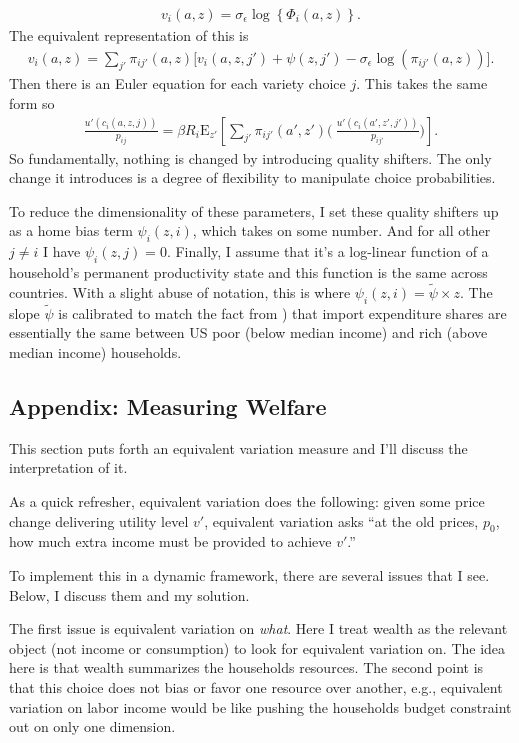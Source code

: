 \documentclass[12pt,pdftex]{article}
\begin{document}
\begin{onehalfspacing}
\begin{align}
v_i(a, z) = \sigma_{\epsilon} \log \left\{ \Phi_{i}(a,z)  \right\}.
\end{align}
The equivalent representation of this is
\begin{align}
v_i(a, z) = \sum_{j'} \pi_{ij'}(a, z) \bigg[ v_{i}(a, z, j') + \psi(z, j') - \sigma_{\epsilon} \log (\pi_{ij'}(a, z))  \bigg].
\end{align}
Then there is an Euler equation for each variety choice $j$. This takes the same form so
\begin{align}
\frac{u'(c_{i}(a, z, j))}{p_{ij}} = \beta R_{i} \mathrm{E}_{z'} \left[ \sum_{j'} \pi_{ij'}(a', z') \bigg( \ \frac{u'(c_{i}(a', z', j'))}{p_{ij'}} \bigg) \right].
\end{align}
So fundamentally, nothing is changed by introducing quality shifters. The only change it introduces is a degree of flexibility to manipulate choice probabilities.

To reduce the dimensionality of these parameters, I set these quality shifters up as a home bias term $\psi_{i}(z,i)$, which takes on some number. And for all other $j \neq i$ I have $\psi_{i}(z,j) = 0$. Finally, I assume that it's a log-linear function of a household's permanent productivity state and this function is the same across countries. With a slight abuse of notation, this is where $\psi_{i}(z,i) = \tilde \psi \times z$. The slope $\tilde \psi$ is calibrated to match the fact from \citet{borusyak2021distributional}) that import expenditure shares are essentially the same between US poor (below median income) and rich (above median income) households.

\subsection{Appendix: Measuring Welfare}\label{apx-sec:measuring-wealfare}

This section puts forth an equivalent variation measure and I'll discuss the interpretation of it.

As a quick refresher, equivalent variation does the following: given some price change delivering utility level $v'$, equivalent variation asks ``at the old prices, $p_0$, how much extra income must be provided to achieve $v'$.''

To implement this in a dynamic framework, there are several issues that I see. Below, I discuss them and my solution.

The first issue is equivalent variation on \emph{what}. Here I treat wealth as the relevant object (not income or consumption) to look for equivalent variation on. The idea here is that wealth summarizes the households resources. The second point is that this choice does not bias or favor one resource over another, e.g., equivalent variation on labor income would be like pushing the households budget constraint out on only one dimension.


\end{onehalfspacing}
\end{document}
